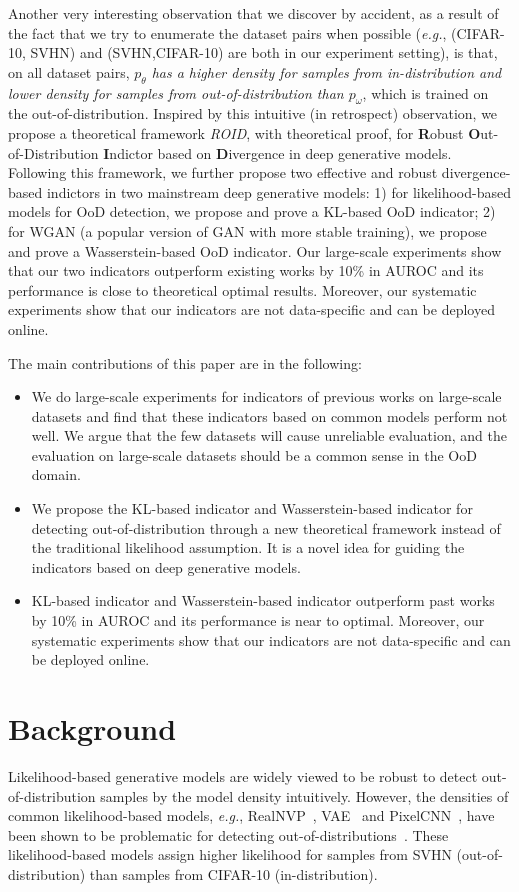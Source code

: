 \documentclass[letterpaper]{article} %
\newcommand{\EG}{\textit{e.g.}, }
\newcommand{\ROID}{\textit{ROID}}
\begin{document}
Another very interesting observation that we discover by accident, as a result of the fact that we try to enumerate the dataset pairs when possible (\EG (CIFAR-10, SVHN) and (SVHN,CIFAR-10) are both in our experiment setting), is that, on all dataset pairs, \textit{$p_\theta$ has a higher density for samples from in-distribution and lower density for samples from out-of-distribution than $p_\omega$}, which is trained on the out-of-distribution. 
Inspired by this intuitive (in retrospect) observation, we propose a theoretical framework 
\ROID{}, with theoretical proof, for \textbf{R}obust \textbf{O}ut-of-Distribution \textbf{I}ndictor based on \textbf{D}ivergence in deep generative models. Following  this framework, we further propose two effective and robust divergence-based indictors in two mainstream deep generative models: 1) for likelihood-based models for OoD detection, we propose and prove a KL-based OoD indicator; 2) for WGAN (a popular version of GAN with more stable training), we propose and prove a Wasserstein-based OoD indicator.
Our large-scale experiments show that our two indicators outperform existing works by 10\% in AUROC and its performance is close to theoretical optimal results. Moreover, our systematic experiments show that our indicators are not data-specific and can be deployed online. 

The main contributions of this paper are in the following:
\begin{itemize}
	\item We do large-scale experiments for indicators of previous works on large-scale datasets and find that these indicators based on common models perform not well. We argue that the few datasets will cause unreliable evaluation, and the evaluation on large-scale datasets should be a common sense in the OoD domain. 
	\item We propose the KL-based indicator and Wasserstein-based indicator for detecting out-of-distribution through a new theoretical framework instead of the traditional likelihood assumption. It is a novel idea for guiding the indicators based on deep generative models. 
	\item KL-based indicator and Wasserstein-based indicator outperform past works by 10\% in AUROC and its performance is near to optimal. Moreover, our systematic experiments show that our indicators are not data-specific and can be deployed online. 
\end{itemize}

\section{Background}
Likelihood-based generative models are widely viewed to be robust to detect out-of-distribution samples by the model density intuitively. However, the densities of common likelihood-based models, \EG RealNVP~\cite{dinh2016density}, VAE~\cite{tomczak2018vae,takahashi2019variational} and PixelCNN~\cite{van2016conditional}, have been shown to be problematic for detecting out-of-distributions~\cite{nalisnick2019do}. These likelihood-based models assign higher likelihood for samples from SVHN (out-of-distribution) than samples from CIFAR-10 (in-distribution). 
\end{document}
